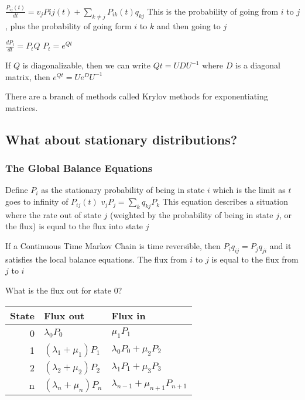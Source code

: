 \documentclass[12pt]{report}
\begin{document}
$\frac{P_{ij}(t)}{dt} = v_j P{ij}(t) + \sum_{k \neq j} P_{ik}(t) q_{kj}$ This is the probability of going from $i$ to $j$, plus the probability of going form $i$ to $k$ and then going to $j$

$\frac{d P_t}{dt} = P_t Q$
$P_t = e^{Qt}$

If $Q$ is diagonalizable, then we can write $Q t =U D U^{-1}$ where $D$ is a diagonal matrix, then $e^{Qt} = Ue^{D}U^{-1}$

There are a branch of methods called Krylov methods for exponentiating matrices.
\subsection{What about stationary distributions?}
\label{sec-1-5}

   
\subsubsection{The Global Balance Equations}
\label{sec-1-5-1}

Define $P_i$ as the stationary probability of being in state $i$ which is the limit as $t$ goes to infinity of $P_{ij}(t)$
$v_j P_j = \sum_k q_{kj} P_k$
This equation describes a situation where the rate out of state $j$ (weighted by the probability of being in state $j$, or the flux) is  equal to the flux into state $j$

If a Continuous Time Markov Chain is time reversible, then $P_i q_{ij} = P_j q_{ji}$ and it satisfies the local balance equations.  The flux from $i$ to $j$ is equal to the flux from $j$ to $i$

What is the flux out for state 0?


\begin{center}
\begin{tabular}{rll}
 State  &  Flux out                   &  Flux in                                    \\
\hline
     0  &  $\lambda_0 P_0$            &  $\mu_1 P_1$                                \\
     1  &  $(\lambda_1 + \mu_1) P_1$  &  $\lambda_0 P_0 + \mu_2 P_2$                \\
     2  &  $(\lambda_2 + \mu_2) P_2$  &  $\lambda_1 P_1 + \mu_3 P_3$                \\
     n  &  $(\lambda_n + \mu_n) P_n$  &  $\lambda_{n-1} + \mu_{n+1} P_{n+1}$  \\
\end{tabular}
\end{center}
\end{document}
